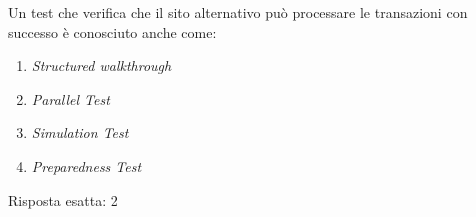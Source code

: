 
\begin{Exercise} [
  title={},
  label={bcdr10}
 ]
 
 \Question Un test che verifica che il sito alternativo può processare
 le transazioni con successo è conosciuto anche come:
 \begin{enumerate}
   \item \textit{Structured walkthrough}
   \item \textit{Parallel Test}
   \item \textit{Simulation Test}
   \item \textit{Preparedness Test}
 \end{enumerate}
  
\end{Exercise}

\begin{Answer} [
  ref={bcdr10},
  number={10}
 ]
 
 \Question Risposta esatta: 2
\end{Answer}

